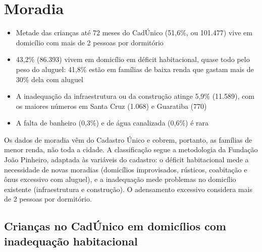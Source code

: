 
\chapter{Moradia}\label{cap:eixo-7}

\begin{achados}\begin{itemize}

\item Metade das crianças até 72 meses do CadÚnico (51,6\%, ou 101.477) vive em domicílio com mais de 2 pessoas por dormitório

\item 43,2\% (86.393) vivem em domicílio em déficit habitacional, quase todo pelo peso do aluguel: 41,8\% estão em famílias de baixa renda que gastam mais de 30\% dela com aluguel

\item A inadequação da infraestrutura ou da construção atinge 5,9\% (11.589), com os maiores números em Santa Cruz (1.068) e Guaratiba (770)

\item A falta de banheiro (0,3\%) e de água canalizada (0,6\%) é rara

\end{itemize}\end{achados}

Os dados de moradia vêm do Cadastro Único e cobrem, portanto, as famílias de menor renda, não toda a cidade. A classificação segue a metodologia da Fundação João Pinheiro, adaptada às variáveis do cadastro: o déficit habitacional mede a necessidade de novas moradias (domicílios improvisados, rústicos, coabitação e ônus excessivo com aluguel), e a inadequação mede problemas no domicílio existente (infraestrutura e construção). O adensamento excessivo considera mais de 2 pessoas por dormitório.

\section{Crianças no CadÚnico em domicílios com inadequação habitacional}

